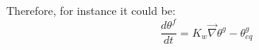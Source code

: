 Therefore, for instance it could be:
\begin{equation}
\frac{d \theta^f}{dt} = K_w \vec{\nabla}{\theta^g - \theta^g_{eq}}
\end{equation}